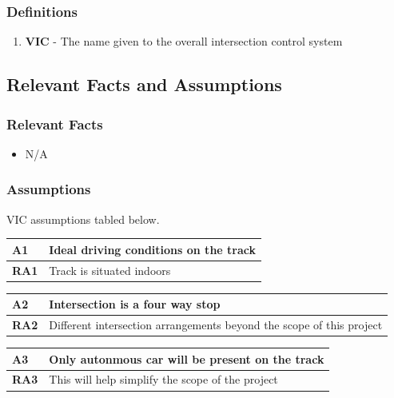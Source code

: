\documentclass [12pt]{article}
\begin{document}
\subsubsection{Definitions}
\begin{enumerate}
	\itemsep0pt
	\item \textbf{VIC} - The name given to the overall intersection control system
\end{enumerate}

	
\subsection{Relevant Facts and Assumptions} 

\subsubsection{Relevant Facts}
\begin{itemize}
	\item N/A
\end{itemize}

\subsubsection{Assumptions}
VIC assumptions tabled below. 
\begin{longtable}{| p{ } | p{ } | }\hline 
\textbf{A1} & \textbf{Ideal driving conditions on the track} \\ \hline
\textbf{RA1} & Track is situated indoors \\ \hline 
\end{longtable}

\begin{longtable}{| p{ } | p{ } | }\hline 
\textbf{A2} & \textbf{Intersection is a four way stop} \\ \hline
\textbf{RA2} &  Different intersection arrangements beyond the scope of this project \\ \hline
\end{longtable}

\begin{longtable}{| p{ } | p{ } | }\hline 
\textbf{A3} & \textbf{Only autonmous car will be present on the track} \\ \hline
\textbf{RA3} &  This will help simplify the scope of the project\\ \hline
\end{longtable}
\end{document}
